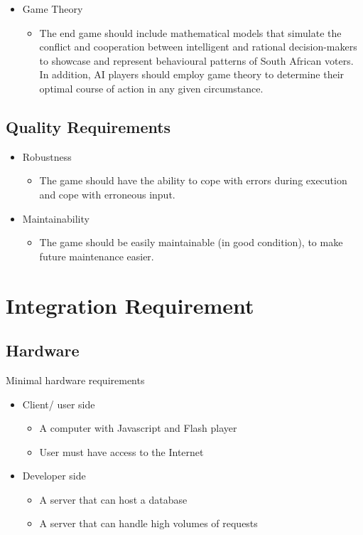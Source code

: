 \documentclass{article}
\begin{document}
\begin{itemize}
	    \item Game Theory 
		\begin{itemize}
			\item The end game should include mathematical models that simulate the conflict and cooperation between intelligent and rational decision-makers to showcase and represent behavioural patterns of South African voters. In addition, AI players should employ game theory to determine their optimal course of action in any given circumstance.
	    \end{itemize}
   
   \end{itemize}
   \subsection{Quality Requirements} 
   \begin{itemize}
    \item Robustness
		\begin{itemize}
			\item The game should have the ability to cope with errors during execution and cope with erroneous input.
	    		
	    \end{itemize}
	    
	    \item Maintainability
		\begin{itemize}
			\item The game should be easily maintainable (in good condition), to make future maintenance easier.
         \end{itemize}
        \end{itemize}
   
  \section{Integration Requirement}
    \subsection{Hardware}
    Minimal hardware requirements
	\begin{itemize}
		\item Client/ user side	
		\begin{itemize}
			\item A computer with Javascript and Flash player 
			\item User must have access to the Internet 
		\end{itemize}
		\item Developer side
		\begin{itemize}
			\item A server that can host a database 
			\item A server that can handle high volumes of requests
		\end{itemize}
	\end{itemize}
\end{document}
